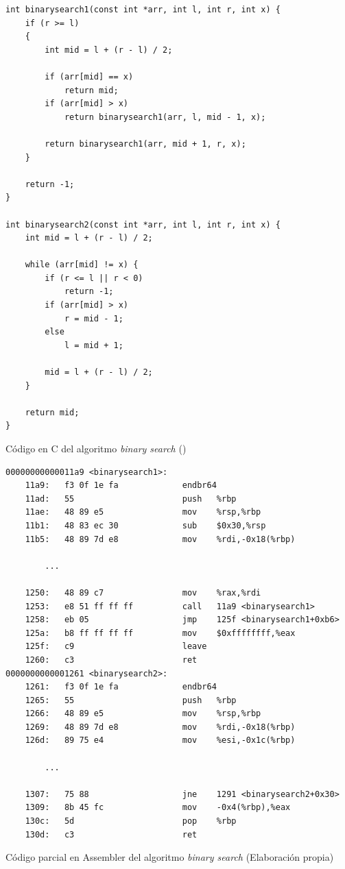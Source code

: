 \begin{mycode}
    \begin{verbatim}
int binarysearch1(const int *arr, int l, int r, int x) {
    if (r >= l)
    {
        int mid = l + (r - l) / 2;

        if (arr[mid] == x)
            return mid;
        if (arr[mid] > x)
            return binarysearch1(arr, l, mid - 1, x);

        return binarysearch1(arr, mid + 1, r, x);
    }

    return -1;
}

int binarysearch2(const int *arr, int l, int r, int x) {
    int mid = l + (r - l) / 2;

    while (arr[mid] != x) {
        if (r <= l || r < 0)
            return -1;
        if (arr[mid] > x)
            r = mid - 1;
        else
            l = mid + 1;

        mid = l + (r - l) / 2;
    }

    return mid;
}
    \end{verbatim}
    \caption[Código en C del algoritmo \textit{binary search}]{Código en C del algoritmo \textit{binary search} (\cite{BinarySearchGitHub})}
    \label{cod:binarySearchC}
\end{mycode}

\begin{mycode}
    \begin{verbatim}
00000000000011a9 <binarysearch1>:
    11a9:	f3 0f 1e fa          	endbr64
    11ad:	55                   	push   %rbp
    11ae:	48 89 e5             	mov    %rsp,%rbp
    11b1:	48 83 ec 30          	sub    $0x30,%rsp
    11b5:	48 89 7d e8          	mov    %rdi,-0x18(%rbp)
    
        ...

    1250:	48 89 c7             	mov    %rax,%rdi
    1253:	e8 51 ff ff ff       	call   11a9 <binarysearch1>
    1258:	eb 05                	jmp    125f <binarysearch1+0xb6>
    125a:	b8 ff ff ff ff       	mov    $0xffffffff,%eax
    125f:	c9                   	leave
    1260:	c3                   	ret
0000000000001261 <binarysearch2>:
    1261:	f3 0f 1e fa          	endbr64
    1265:	55                   	push   %rbp
    1266:	48 89 e5             	mov    %rsp,%rbp
    1269:	48 89 7d e8          	mov    %rdi,-0x18(%rbp)
    126d:	89 75 e4             	mov    %esi,-0x1c(%rbp)
    
        ...

    1307:	75 88                	jne    1291 <binarysearch2+0x30>
    1309:	8b 45 fc             	mov    -0x4(%rbp),%eax
    130c:	5d                   	pop    %rbp
    130d:	c3                   	ret
    \end{verbatim}
    \caption[Código parcial en assembler del algoritmo \textit{binary search}]{Código parcial en Assembler del algoritmo \textit{binary search} (Elaboración propia)}
    \label{cod:binarySearchAsm_parcial}
\end{mycode}

